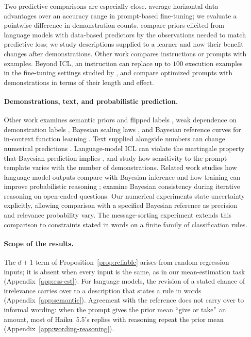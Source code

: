 \documentclass{article}
\theoremstyle{definition}
\begin{document}
Two predictive comparisons are especially close. \citet{lescao2021} average horizontal data advantages over an accuracy range in prompt-based fine-tuning; we evaluate a pointwise difference in demonstration counts. \citet{selby2025} compare priors elicited from language models with data-based predictors by the observations needed to match predictive loss; we study descriptions supplied to a learner and how their benefit changes after demonstrations. Other work compares instructions or prompts with examples. Beyond ICL, an instruction can replace up to $100$ execution examples in the fine-tuning settings studied by \citet{cook2026}, and \citet{wenliang2026} compare optimized prompts with demonstrations in terms of their length and effect.

\paragraph{Demonstrations, text, and probabilistic prediction.}
Other work examines semantic priors and flipped labels \citep{wei2023}, weak dependence on demonstration labels \citep{min2022}, Bayesian scaling laws \citep{arora2025}, and Bayesian reference curves for in-context function learning \citep{akata2026}. Text supplied alongside numbers can change numerical predictions \citep{requeima2024}. Language-model ICL can violate the martingale property that Bayesian prediction implies \citep{falck2024}, and \citet{tong2026} study how sensitivity to the prompt template varies with the number of demonstrations. Related work studies how language-model outputs compare with Bayesian inference and how training can improve probabilistic reasoning \citep{qiu2026}; \citet{he2025} examine Bayesian consistency during iterative reasoning on open-ended questions. Our numerical experiments state uncertainty explicitly, allowing comparison with a specified Bayesian reference as precision and relevance probability vary. The message-sorting experiment extends this comparison to constraints stated in words on a finite family of classification rules.

\paragraph{Scope of the results.}
The $d+1$ term of Proposition~\ref{prop:reliable} arises from random regression inputs; it is absent when every input is the same, as in our mean-estimation task (Appendix~\ref{app:ess-est}). For language models, the revision of a stated chance of irrelevance carries over to a description that states a rule in words (Appendix~\ref{app:semantic}). Agreement with the reference does not carry over to informal wording: when the prompt gives the prior mean ``give or take'' an amount, most of Haiku~5.5's replies with reasoning repeat the prior mean (Appendix~\ref{app:wording-reasoning}).
\end{document}
